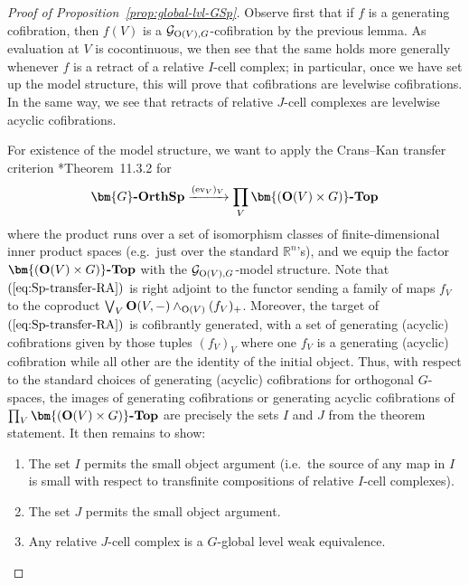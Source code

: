\documentclass[reqno]{memo-l}
\theoremstyle{mythm}
\theoremstyle{definition}
\numberwithin{equation}{section}
\newcommand{\R} {{\mathbb{R}}}
\DeclareMathOperator{\ev}{ev}
\newcommand{\cat}[1]{\textbf{\textup{#1}}}
\renewcommand{\O}{{\textup{O}}}
\let\smashp=\wedge
\newcommand{\Gosp}[1]{\cat{$\bm{#1}$-OrthSp}}
\begin{document}
\begin{proof}[Proof of Proposition~\ref{prop:global-lvl-GSp}]
    Observe first that if $f$ is a generating cofibration, then $f(V)$ is a $\mathcal G_{\O(V),G}$-cofibration by the previous lemma. As evaluation at $V$ is cocontinuous, we then see that the same holds more generally whenever $f$ is a retract of a relative $I$-cell complex; in particular, once we have set up the model structure, this will prove that cofibrations are levelwise cofibrations. In the same way, we see that retracts of relative $J$-cell complexes are levelwise acyclic cofibrations.

    For existence of the model structure, we want to apply the Crans--Kan transfer criterion \cite{hirschhorn-book}*{Theorem~11.3.2} for
    \begin{equation}\label{eq:Sp-transfer-RA}
        \Gosp{G}\xrightarrow{(\ev_V)_V}\prod_V\cat{$\bm{(\O(V)\times G)}$-Top}
    \end{equation}
    where the product runs over a set of isomorphism classes of finite-dimensional inner product spaces (e.g.\ just over the standard $\R^n$'s), and we equip the factor $\cat{$\bm{(\O(V)\times G)}$-Top}$ with the $\mathcal G_{\O(V),G}$-model structure. Note that $(\ref{eq:Sp-transfer-RA})$ is right adjoint to the functor sending a family of maps $f_V$ to the coproduct $\bigvee_{V}\cat{O}(V,-)\smashp_{\O(V)} (f_V)_+$. Moreover, the target of $(\ref{eq:Sp-transfer-RA})$ is cofibrantly generated, with a set of generating (acyclic) cofibrations given by those tuples $(f_V)_V$ where one $f_V$ is a generating (acyclic) cofibration while all other are the identity of the initial object. Thus, with respect to the standard choices of generating (acyclic) cofibrations for orthogonal $G$-spaces, the images of generating cofibrations or generating acyclic cofibrations of $\prod_V\cat{$\bm{(\O(V)\times G)}$-Top}$ are precisely the sets $I$ and $J$ from the theorem statement. It then remains to show:
    \begin{enumerate}
        \item The set $I$ permits the small object argument (i.e.\ the source of any map in $I$ is small with respect to transfinite compositions of relative $I$-cell complexes).
        \item The set $J$ permits the small object argument.
        \item Any relative $J$-cell complex is a $G$-global level weak equivalence.
    \end{enumerate}

\end{proof}
\end{document}
